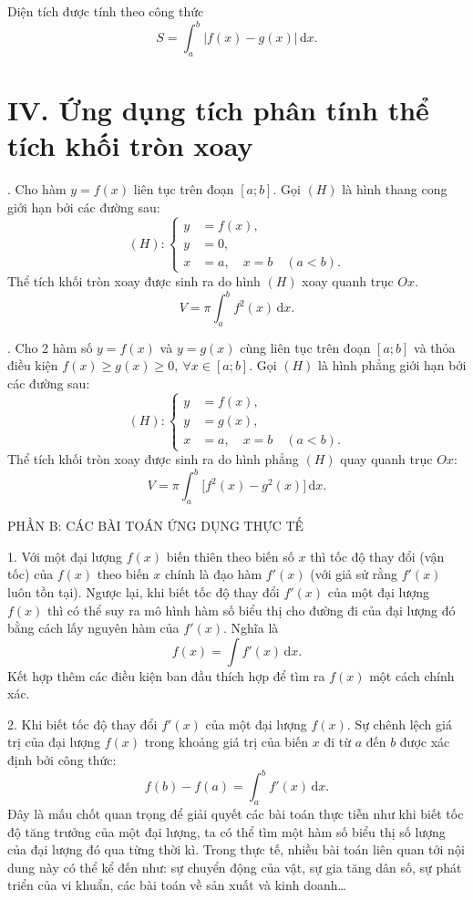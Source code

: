 \documentclass[12pt,a4paper]{article}
\newcommand{\dd}{\,\mathrm{d}}
\begin{document}
Diện tích được tính theo công thức
\[
\boxed{S=\int_a^b\left|f(x)-g(x)\right|\dd x}.
\]

\section*{IV. Ứng dụng tích phân tính thể tích khối tròn xoay}

. Cho hàm $y=f(x)$ liên tục trên đoạn $[a;b]$. Gọi $(H)$ là hình thang cong giới hạn bởi các đường sau:
\[
(H):\left\{
\begin{aligned}
y&=f(x),\\
y&=0,\\
x&=a,\quad x=b\quad(a<b).
\end{aligned}
\right.
\]
Thể tích khối tròn xoay được sinh ra do hình $(H)$ xoay quanh trục $Ox$.
\[
\boxed{V=\pi\int_a^b f^2(x)\dd x}.
\]

. Cho 2 hàm số $y=f(x)$ và $y=g(x)$ cùng liên tục trên đoạn $[a;b]$ và thỏa điều kiện
$f(x)\ge g(x)\ge0,\ \forall x\in[a;b]$. Gọi $(H)$ là hình phẳng giới hạn bởi các đường sau:
\[
(H):\left\{
\begin{aligned}
y&=f(x),\\
y&=g(x),\\
x&=a,\quad x=b\quad(a<b).
\end{aligned}
\right.
\]
Thể tích khối tròn xoay được sinh ra do hình phẳng $(H)$ quay quanh trục $Ox$:
\[
\boxed{V=\pi\int_a^b\bigl[f^2(x)-g^2(x)\bigr]\dd x}.
\]

\begin{partbox}PHẦN B: CÁC BÀI TOÁN ỨNG DỤNG THỰC TẾ\end{partbox}

1. Với một đại lượng $f(x)$ biến thiên theo biến số $x$ thì tốc độ thay đổi (vận tốc) của
$f(x)$ theo biến $x$ chính là đạo hàm $f'(x)$ (với giả sử rằng $f'(x)$ luôn tồn tại). Ngược lại,
khi biết tốc độ thay đổi $f'(x)$ của một đại lượng $f(x)$ thì có thể suy ra mô hình hàm số
biểu thị cho đường đi của đại lượng đó bằng cách lấy nguyên hàm của $f'(x)$. Nghĩa là
\[
f(x)=\int f'(x)\dd x.
\]
Kết hợp thêm các điều kiện ban đầu thích hợp để tìm ra $f(x)$ một cách chính xác.

2. Khi biết tốc độ thay đổi $f'(x)$ của một đại lượng $f(x)$. Sự chênh lệch giá trị của đại
lượng $f(x)$ trong khoảng giá trị của biến $x$ đi từ $a$ đến $b$ được xác định bởi công thức:
\[
f(b)-f(a)=\int_a^b f'(x)\dd x.
\]
Đây là mấu chốt quan trọng để giải quyết các bài toán thực tiễn như khi biết tốc độ tăng
trưởng của một đại lượng, ta có thể tìm một hàm số biểu thị số lượng của đại lượng đó qua
từng thời kì. Trong thực tế, nhiều bài toán liên quan tới nội dung này có thể kể đến như: sự
chuyển động của vật, sự gia tăng dân số, sự phát triển của vi khuẩn, các bài toán về sản
xuất và kinh doanh…
\end{document}
